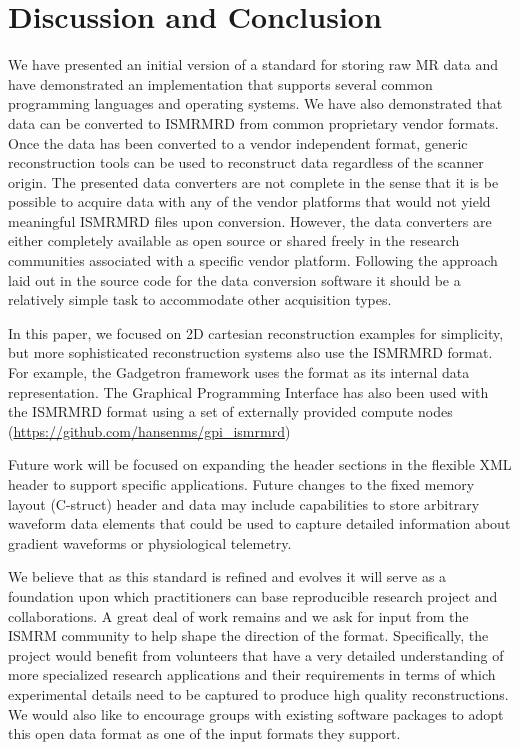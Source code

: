 \documentclass[12pt]{article}
\begin{document}
\section*{Discussion and Conclusion}
We have presented an initial version of a standard for storing raw MR data and have demonstrated an implementation that supports several common programming languages and operating systems. We have also demonstrated that data can be converted to ISMRMRD from common proprietary vendor formats. Once the data has been converted to a vendor independent format, generic reconstruction tools can be used to reconstruct data regardless of the scanner origin. The presented data converters are not complete in the sense that it is be possible to acquire data with any of the vendor platforms that would not yield meaningful ISMRMRD files upon conversion. However, the data converters are either completely available as open source or shared freely in the research communities associated with a specific vendor platform. Following the approach laid out in the source code for the data conversion software it should be a relatively simple task to accommodate other acquisition types. 

In this paper, we focused on 2D cartesian reconstruction examples for simplicity, but more sophisticated reconstruction systems also use the ISMRMRD format. For example, the Gadgetron \cite{Hansen:2013aa} framework uses the format as its internal data representation. The Graphical Programming Interface \cite{Zwart:2014aa} has also been used with the ISMRMRD format using a set of externally provided compute nodes (\url{https://github.com/hansenms/gpi_ismrmrd})

Future work will be focused on expanding the header sections in the flexible XML header to support specific applications.  Future changes to the fixed memory layout (C-struct) header and data may include capabilities to store arbitrary waveform data elements that could be used to capture detailed information about gradient waveforms or physiological telemetry. 

We believe that as this standard is refined and evolves it will serve as a foundation upon which practitioners can base reproducible research project and collaborations.  A great deal of work remains and we ask for input from the ISMRM community to help shape the direction of the format. Specifically, the project would benefit from volunteers that have a very detailed understanding of more specialized research applications and their requirements in terms of which experimental details need to be captured to produce high quality reconstructions. We would also like to encourage groups with existing software packages to adopt this open data format as one of the input formats they support. 
\end{document}
